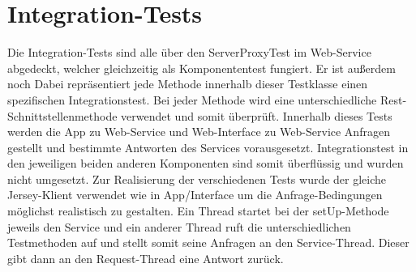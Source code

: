 \section{Integration-Tests}

Die Integration-Tests sind alle über den ServerProxyTest im Web-Service abgedeckt, welcher gleichzeitig als Komponententest fungiert. Er ist außerdem noch  Dabei repräsentiert jede Methode innerhalb dieser Testklasse einen spezifischen Integrationstest. Bei jeder Methode wird eine unterschiedliche Rest-Schnittstellenmethode verwendet und somit überprüft. Innerhalb dieses Tests werden die App zu Web-Service und Web-Interface zu Web-Service Anfragen gestellt und bestimmte Antworten des Services vorausgesetzt. Integrationstest in den jeweiligen beiden anderen Komponenten sind somit überflüssig und wurden nicht umgesetzt. Zur Realisierung der verschiedenen Tests wurde der gleiche Jersey-Klient verwendet wie in App/Interface um die Anfrage-Bedingungen möglichst realistisch zu gestalten. Ein Thread startet bei der setUp-Methode jeweils den Service und ein anderer Thread ruft die unterschiedlichen Testmethoden auf und stellt somit seine Anfragen an den Service-Thread. Dieser gibt dann an den Request-Thread eine Antwort zurück.

